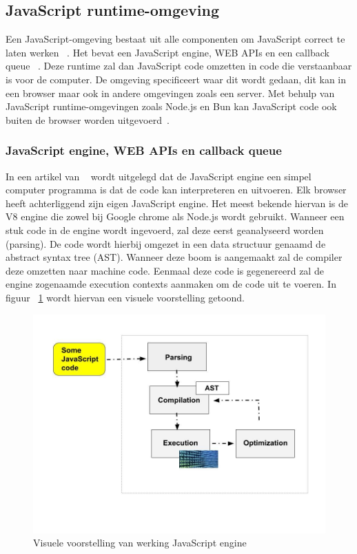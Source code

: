 \subsection{JavaScript runtime-omgeving}
Een JavaScript-omgeving bestaat uit alle componenten om JavaScript correct te laten werken ~\autocite{Christopher}. 
Het bevat een JavaScript engine, WEB APIs en een callback queue ~\autocite{Christopher}. 
Deze runtime zal dan JavaScript code omzetten in code die verstaanbaar is voor de computer.
De omgeving specificeert waar dit wordt gedaan, dit kan in een browser maar ook in andere omgevingen zoals een server.
Met behulp van JavaScript runtime-omgevingen zoals Node.js en Bun kan JavaScript code ook buiten de browser worden uitgevoerd~\autocite{Mozilla2023}.

\subsubsection{JavaScript engine, WEB APIs en callback queue}

In een artikel van ~\textcite{Christopher}
wordt uitgelegd dat de JavaScript engine een simpel computer programma is dat de code kan interpreteren en uitvoeren.
Elk browser heeft achterliggend zijn eigen JavaScript engine. Het meest bekende hiervan is de
V8 engine die zowel bij Google chrome als Node.js wordt gebruikt. 
Wanneer een stuk code in de engine wordt ingevoerd, zal deze eerst geanalyseerd worden (parsing). 
De code wordt hierbij omgezet in een data structuur genaamd de abstract syntax tree (AST).
Wanneer deze boom is aangemaakt zal de compiler deze omzetten naar machine code. 
Eenmaal deze code is gegenereerd zal de engine zogenaamde execution contexts aanmaken om de code uit te voeren.
In figuur ~\ref{fig:JavaScriptengine} wordt hiervan een visuele voorstelling getoond.
\begin{figure}[H]
    \centering
    \includegraphics[width=.9\textwidth]{graphics/javascriptengine.jpeg}
    \caption[Werking JavaScript engine]{\label{fig:JavaScriptengine}Visuele voorstelling van werking JavaScript engine ~\autocite{Christopher}}
\end{figure}

